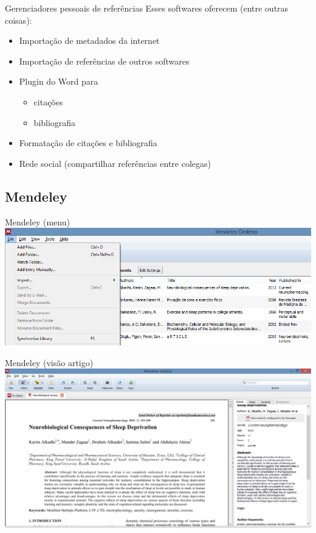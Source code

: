 \documentclass{beamer}
\begin{document}
\begin{frame}{Gerenciadores pessoais de referências}
  Esses softwares oferecem (entre outras coisas):
  \begin{itemize}
  \item Importação de metadados da internet
  \item Importação de referências de outros softwares
  \item Plugin do Word para
    \begin{itemize}
    \item<3-> citações
    \item<3-> bibliografia
    \end{itemize}
  \item Formatação de citações e bibliografia
  \item Rede social (compartilhar referências entre colegas)
  \end{itemize}
\end{frame}

\subsection{Mendeley}

\begin{frame}{Mendeley (menu)}
  \includegraphics[width=1.2\textwidth]{Referencias/mendeley-menu}
\end{frame}

\begin{frame}{Mendeley (visão artigo)}
  \includegraphics[width=1.2\textwidth]{Referencias/mendeley-artigo}
\end{frame}
\end{document}
